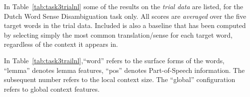 
In Table~\ref{tab:task3trialnl} some of the results on the \emph{trial data}
are listed, for the Dutch Word Sense Disambiguation task only.  All scores are
\emph{averaged} over the five target words in the trial data. Included is also
a baseline that has been computed by selecting simply the most common
translation/sense for each target word, regardless of the context it appears
in. 

\begin{table}
\label{tab:task3trialnl}
\footnotesize{
\noindent{}
\caption{Average scores for various configurations on the trial data of the English-\emph{Dutch} Word Sense Disambiguation
    task, averaged over five target words. At the time this experiment was conducted, a bug existed in the output format specification, resulting in slightly lower scores.}
}
\end{table}

In Table~\ref{tab:task3trailnl},``word'' refers to the surface forms of the
words, ``lemma'' denotes lemma features, ``pos'' denotes Part-of-Speech
information. The subsequent number refers to the local context size. The
``global'' configuration refers to global context features.

